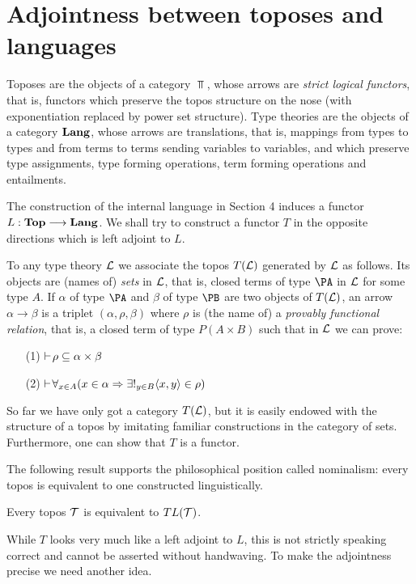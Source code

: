 \section{Adjointness between toposes and languages}

Toposes are the objects of a category $\Top$, whose arrows are
{\em strict logical functors}, that is, functors which preserve the topos
structure on the nose (with exponentiation replaced by power set structure). Type theories are
the objects of a category ${\mathbf {Lang}}$, whose arrows are translations, that is,
mappings from types to types and from terms to terms sending variables to
variables, and which preserve type assignments, type forming operations, term
forming operations and entailments.

The construction of the internal language in Section 4 induces a functor
$L: {\mathbf {Top}} \longrightarrow {\mathbf {Lang}}$. We shall try to construct a functor
$T$ in the opposite directions which is left adjoint to $L$.

To any type theory ${\mathcal L}$ we associate the topos $T({\mathcal L})$ generated by ${\mathcal L}$ as
follows. Its objects are (names of) {\em sets} in ${\mathcal L}$, that is, closed terms of type
$\PA$ in ${\mathcal L}$ for some type $A$. If $\alpha$ of type $\PA$ and $\beta$ of type $\PB$ are two
objects of $T({\mathcal L})$, an arrow $\alpha \to \beta$ is a
triplet $(\alpha,\rho, \beta)$ where $\rho$
is (the name of) a {\em provably functional relation},
that is, a closed term of type
$P(A \times B)$ such that in ${\mathcal L}$ we can prove:
\begin{enumerate}
\item[(1)] $\vdash {\!\rho} \subseteq \alpha \times \beta$
\item[(2)] $\vdash\! \forall_{x \in A} (x \in \alpha \Rightarrow \exists!_{y \in B} \langle x,y \rangle \in \rho)$
\end{enumerate}
So far we have only got a category $T({\mathcal L})$, but it is easily endowed with the
structure of a topos by imitating familiar constructions in the category of
sets. Furthermore, one can show that $T$ is a functor.

The following result supports the philosophical position called
nominalism: every topos is equivalent to one constructed linguistically.

\begin{prop}
Every topos ${\mathcal T}$ is equivalent to $TL({\mathcal T})$.
\end{prop}

While $T$ looks very much like a left adjoint to $L$, this is not strictly
speaking correct and cannot be asserted without handwaving. To make the
adjointness precise we need another idea.

